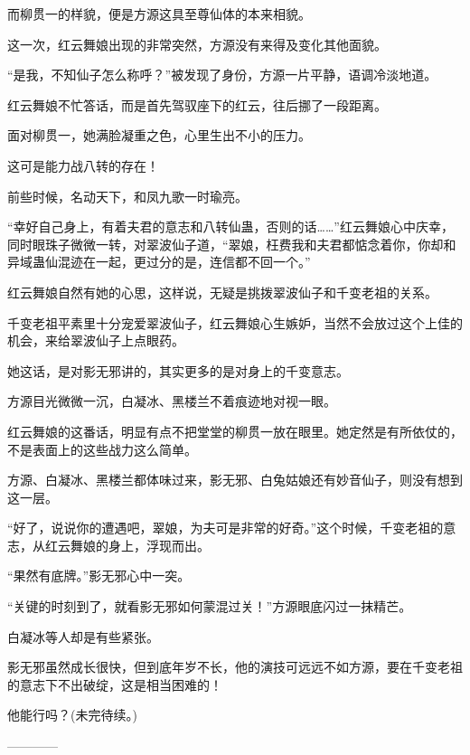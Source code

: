 \begin{this_body}
而柳贯一的样貌，便是方源这具至尊仙体的本来相貌。

这一次，红云舞娘出现的非常突然，方源没有来得及变化其他面貌。

“是我，不知仙子怎么称呼？”被发现了身份，方源一片平静，语调冷淡地道。

红云舞娘不忙答话，而是首先驾驭座下的红云，往后挪了一段距离。

面对柳贯一，她满脸凝重之色，心里生出不小的压力。

这可是能力战八转的存在！

前些时候，名动天下，和凤九歌一时瑜亮。

“幸好自己身上，有着夫君的意志和八转仙蛊，否则的话……”红云舞娘心中庆幸，同时眼珠子微微一转，对翠波仙子道，“翠娘，枉费我和夫君都惦念着你，你却和异域蛊仙混迹在一起，更过分的是，连信都不回一个。”

红云舞娘自然有她的心思，这样说，无疑是挑拨翠波仙子和千变老祖的关系。

千变老祖平素里十分宠爱翠波仙子，红云舞娘心生嫉妒，当然不会放过这个上佳的机会，来给翠波仙子上点眼药。

她这话，是对影无邪讲的，其实更多的是对身上的千变意志。

方源目光微微一沉，白凝冰、黑楼兰不着痕迹地对视一眼。

红云舞娘的这番话，明显有点不把堂堂的柳贯一放在眼里。她定然是有所依仗的，不是表面上的这些战力这么简单。

方源、白凝冰、黑楼兰都体味过来，影无邪、白兔姑娘还有妙音仙子，则没有想到这一层。

“好了，说说你的遭遇吧，翠娘，为夫可是非常的好奇。”这个时候，千变老祖的意志，从红云舞娘的身上，浮现而出。

“果然有底牌。”影无邪心中一突。

“关键的时刻到了，就看影无邪如何蒙混过关！”方源眼底闪过一抹精芒。

白凝冰等人却是有些紧张。

影无邪虽然成长很快，但到底年岁不长，他的演技可远远不如方源，要在千变老祖的意志下不出破绽，这是相当困难的！

他能行吗？(未完待续。)

------------

\end{this_body}

